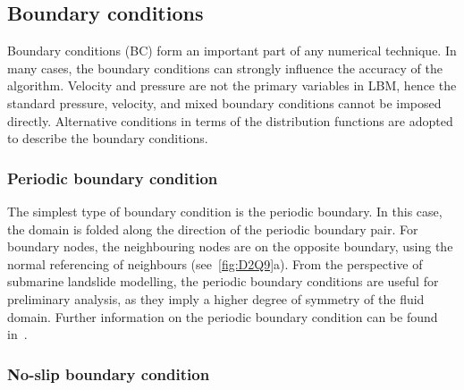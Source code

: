 
\subsection{Boundary conditions}
\label{sec:lbm_bc}
Boundary conditions (BC) form an important part of any numerical technique. In 
many cases, the boundary conditions can strongly influence the accuracy of the 
algorithm. Velocity and pressure are not the primary variables in LBM, 
hence the standard pressure, velocity, and mixed boundary conditions cannot be 
imposed directly. Alternative conditions in terms of the distribution 
functions are adopted to describe the boundary conditions.

\subsubsection*{Periodic boundary condition}

The simplest type of boundary condition is the periodic boundary. In this case, 
the domain is folded along the direction of the periodic boundary pair. For 
boundary nodes, the neighbouring nodes are on the opposite boundary, using the 
normal referencing of neighbours (see~\cref{fig:D2Q9}a). From the perspective 
of submarine landslide modelling, the periodic boundary conditions are useful 
for preliminary analysis, as they imply a higher degree of symmetry of the 
fluid domain. Further information on the periodic boundary condition can be 
found in~\citet{Aidun1998}.

\subsubsection*{No-slip boundary condition} \label{bounce}

